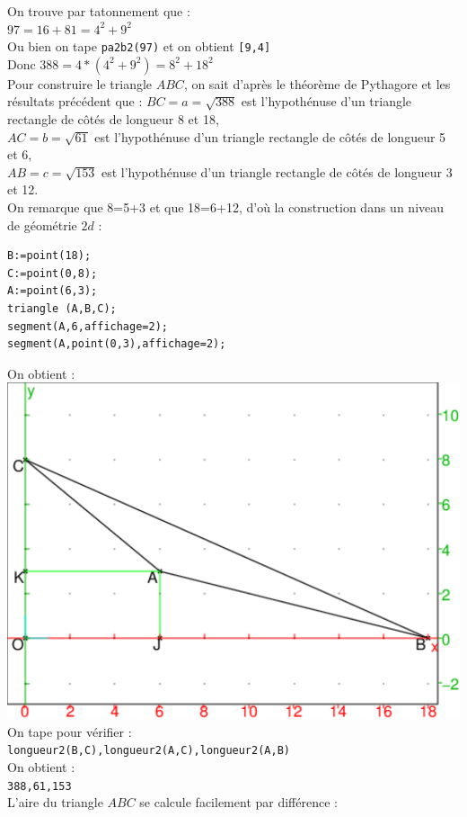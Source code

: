 \documentclass[a4paper,11pt]{book}
\begin{document}
On trouve par tatonnement que :\\
$97=16+81=4^2+9^2$\\
Ou bien on tape {\tt pa2b2(97)} et on obtient {\tt [9,4]}\\ 
Donc $388=4*(4^2+9^2)=8^2+18^2$\\
Pour construire le triangle $ABC$, on sait d'apr\`es le th\'eor\`eme de 
Pythagore et les r\'esultats pr\'ec\'edent que :
$BC=a=\sqrt{388}$ est l'hypoth\'enuse d'un triangle rectangle de c\^ot\'es de 
longueur 8 et 18,\\
$AC=b=\sqrt{61}$ est l'hypoth\'enuse d'un triangle rectangle de c\^ot\'es de 
longueur 5 et 6,\\ 
$AB=c=\sqrt{153}$ est l'hypoth\'enuse d'un triangle rectangle de c\^ot\'es de 
longueur 3 et 12.\\
On remarque que 8=5+3 et que 18=6+12, d'o\`u la construction dans un niveau de 
g\'eom\'etrie $2d$ :
\begin{verbatim}
B:=point(18);
C:=point(0,8);
A:=point(6,3);
triangle (A,B,C);
segment(A,6,affichage=2);
segment(A,point(0,3),affichage=2);
\end{verbatim}
On obtient :\\
\includegraphics[width=\textwidth]{troistri}\\
On tape pour v\'erifier :\\
{\tt longueur2(B,C),longueur2(A,C),longueur2(A,B)}\\
On obtient :\\
{\tt 388,61,153}\\
L'aire du triangle $ABC$ se calcule facilement par diff\'erence :\\
\end{document}
